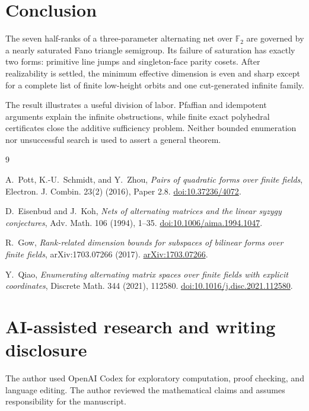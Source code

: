 \documentclass[11pt]{article}
\theoremstyle{remark}
\numberwithin{equation}{section}
\begin{document}
\section{Conclusion}


The seven half-ranks of a three-parameter alternating net over $\mathbb F_2$
are governed by a nearly saturated Fano triangle semigroup. Its failure of
saturation has exactly two forms: primitive line jumps and singleton-face parity
cosets. After realizability is settled, the minimum effective dimension is even
and sharp except for a complete list of finite low-height orbits and one
cut-generated infinite family.

The result illustrates a useful division of labor. Pfaffian and idempotent
arguments explain the infinite obstructions, while finite exact polyhedral
certificates close the additive sufficiency problem. Neither bounded enumeration
nor unsuccessful search is used to assert a general theorem.

\begin{thebibliography}{9}
\footnotesize
\raggedright

A.~Pott, K.-U.~Schmidt, and Y.~Zhou,
\emph{Pairs of quadratic forms over finite fields},
Electron. J. Combin. 23(2) (2016), Paper 2.8.
\href{https://doi.org/10.37236/4072}{doi:10.37236/4072}.

D.~Eisenbud and J.~Koh,
\emph{Nets of alternating matrices and the linear syzygy conjectures},
Adv. Math. 106 (1994), 1--35.
\href{https://doi.org/10.1006/aima.1994.1047}{doi:10.1006/aima.1994.1047}.

R.~Gow,
\emph{Rank-related dimension bounds for subspaces of bilinear forms over finite fields},
arXiv:1703.07266 (2017).
\href{https://arxiv.org/abs/1703.07266}{arXiv:1703.07266}.

Y.~Qiao,
\emph{Enumerating alternating matrix spaces over finite fields with explicit coordinates},
Discrete Math. 344 (2021), 112580.
\href{https://doi.org/10.1016/j.disc.2021.112580}{doi:10.1016/j.disc.2021.112580}.

\end{thebibliography}

\section*{AI-assisted research and writing disclosure}

The author used OpenAI Codex for exploratory computation, proof checking, and
language editing. The author reviewed the mathematical claims and assumes
responsibility for the manuscript.
\end{document}
